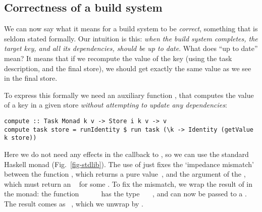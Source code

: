 \subsection{Correctness of a build system} \label{sec-build-correctness}

We can now say what it means for a build system to be \emph{correct}, something
that is seldom stated formally. Our intuition is this: \emph{when the build
system completes, the target key, and all its dependencies, should be up to
date}. What does ``up to date'' mean? It means that if we recompute the value of
the key (using the task description, and the final store), we should get exactly
the same value as we see in the final store.

To express this formally we need an auxiliary function , that
computes the value of a key in a given store \emph{without attempting to update
any dependencies}:

\begin{verbatim}
compute :: Task Monad k v -> Store i k v -> v
compute task store = runIdentity $ run task (\k -> Identity (getValue k store))
\end{verbatim}

\noindent
Here we do not need any effects in the  callback to , so
we can use the standard Haskell  monad (Fig.~\ref{fig-stdlib}).
The use of  just fixes the `impedance mismatch' between the
function , which returns a pure value~, and the 
argument of the , which must return an ~ for some .
To fix the mismatch, we wrap the result of  in the 
monad: the function
\hs{\@@k}~\hs{->}~~~~ has the type
~\hs{->}~~, and can now be passed to a . The
result comes as ~, which we unwrap by .


